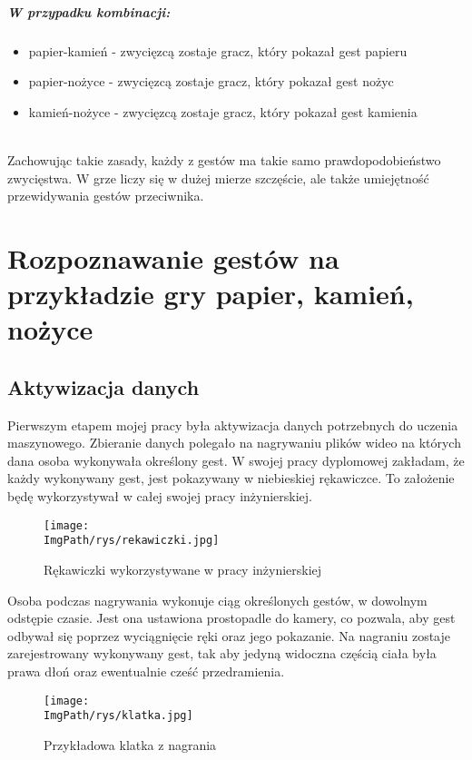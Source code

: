 \documentclass[a4paper,12pt,twoside,openany]{report}
\newcommand{\ImgPath}{.}
\begin{document}
\paragraph{W przypadku kombinacji:}
\begin{itemize} 
\item papier-kamień - zwycięzcą zostaje gracz, który pokazał gest papieru
\item papier-nożyce - zwycięzcą zostaje gracz, który pokazał gest nożyc
\item kamień-nożyce - zwycięzcą zostaje gracz, który pokazał gest kamienia
\end{itemize} 
\mbox{} \\	
Zachowując takie zasady, każdy z gestów ma takie samo prawdopodobieństwo zwycięstwa. W grze liczy się w dużej mierze szczęście, ale także umiejętność przewidywania gestów przeciwnika.

\chapter{Rozpoznawanie gestów na przykładzie gry papier, kamień, nożyce}
\section{Aktywizacja danych}
Pierwszym etapem mojej pracy była aktywizacja danych potrzebnych do uczenia maszynowego. Zbieranie danych polegało na nagrywaniu plików wideo na których dana osoba wykonywała określony gest. W swojej pracy dyplomowej zakładam, że każdy wykonywany gest, jest pokazywany w niebieskiej rękawiczce. To założenie będę wykorzystywał w całej swojej pracy inżynierskiej.

\begin{figure}[H]	
	\centering
	\texttt{[image: \\ImgPath/rys/rekawiczki.jpg]}
	
	\caption{Rękawiczki wykorzystywane w pracy inżynierskiej}
\end{figure}

Osoba podczas nagrywania wykonuje ciąg określonych gestów, w dowolnym odstępie czasie. Jest ona ustawiona prostopadle do kamery, co pozwala, aby gest odbywał się poprzez wyciągnięcie ręki oraz jego pokazanie. Na nagraniu zostaje zarejestrowany wykonywany gest, tak aby jedyną widoczna częścią ciała była prawa dłoń oraz ewentualnie cześć przedramienia. 

\begin{figure}[H]	
	\centering
	\texttt{[image: \\ImgPath/rys/klatka.jpg]}
	
	\caption{Przykładowa klatka z nagrania}
\end{figure}
\end{document}

